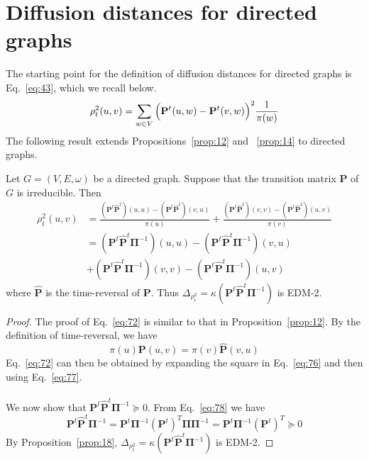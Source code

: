 \section{Diffusion distances for directed graphs}
\label{sec:diff-dist-direct}
The starting point for the definition of diffusion distances for
directed graphs is Eq.~\eqref{eq:43}, which we recall below.
\begin{equation}
  \label{eq:76}
  \rho^{2}_{t}(u,v) = \sum_{w \in V}{\Bigl(\mathbf{P}^{t}(u,w) -
      \mathbf{P}^{t}(v,w)\Bigr)^2 \frac{1}{\pi(w)}}
\end{equation}
The following result extends Propositions~\ref{prop:12} and
~\ref{prop:14} to directed graphs.
\begin{proposition}
  \label{prop:20}
  Let $G = (V,E,\omega)$ be a directed graph. Suppose that
  the transition matrix $\mathbf{P}$ of $G$ is irreducible. Then
  \begin{equation}
    \label{eq:72}
     \begin{split}
      \rho_{t}^{2}(u,v) &= \frac{(\mathbf{P}^{t}\hat{\mathbf{P}}^{t})(u,u) -
        (\mathbf{P}^{t}\hat{\mathbf{P}}^{t})(v,u)}{\pi(u)} +
      \frac{(\mathbf{P}^{t}\hat{\mathbf{P}}^{t})(v,v) -
        (\mathbf{P}^{t}\hat{\mathbf{P}}^{t})(u,v)}{\pi(v)}  \\
      &= (\mathbf{P}^{t}\hat{\mathbf{P}}^{t}\bm{\Pi}^{-1})(u,u) -
      (\mathbf{P}^{t}\hat{\mathbf{P}}^{t}\bm{\Pi}^{-1})(v,u) \\
      &+ (\mathbf{P}^{t}\hat{\mathbf{P}}^{t}\bm{\Pi}^{-1})(v,v) -
      (\mathbf{P}^{t}\hat{\mathbf{P}}^{t}\bm{\Pi}^{-1})(u,v)
    \end{split}
  \end{equation}
  where $\hat{\mathbf{P}}$ is the time-reversal of $\mathbf{P}$.  Thus
  $\Delta_{\rho_{t}^{2}} =
  \kappa(\mathbf{P}^{t}\hat{\mathbf{P}}^{t}\bm{\Pi}^{-1})$ is EDM-2.
\end{proposition}
\begin{proof}
  The proof of Eq.~\eqref{eq:72} is similar to that in
  Proposition~\ref{prop:12}. By the definition of time-reversal, we
  have
  \begin{equation}
    \label{eq:77}
    \pi(u) \mathbf{P}(u,v) = \pi(v) \hat{\mathbf{P}}(v,u)
  \end{equation}
  Eq.~\eqref{eq:72} can then be obtained by expanding the square in
  Eq.~\eqref{eq:76} and then using Eq.~\eqref{eq:77}. \\ \\
  \noindent We now show that
  $\mathbf{P}^{t}\hat{\mathbf{P}}^{t}\bm{\Pi}^{-1} \succeq 0$. From
  Eq.~\eqref{eq:78} we have
  \begin{equation}
    \label{eq:79}
      \mathbf{P}^{t}\hat{\mathbf{P}}^{t}\bm{\Pi}^{-1} = 
      \mathbf{P}^{t}\bm{\Pi}^{-1}(\mathbf{P}^{t})^{T}\bm{\Pi}\bm{\Pi}^{-1}
      = \mathbf{P}^{t}\bm{\Pi}^{-1}(\mathbf{P}^{t})^{T} \succeq 0
  \end{equation}
  By Proposition~\ref{prop:18}, $\Delta_{\rho_{t}^2} =
  \kappa(\mathbf{P}^{t}\hat{\mathbf{P}}^{t}\bm{\Pi}^{-1})$ is EDM-2.
\end{proof}

